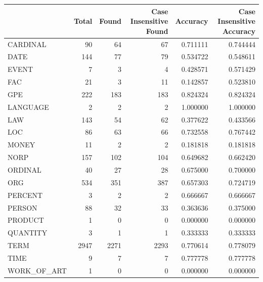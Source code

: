 \begin{tabular}{lrrrrr}
\toprule
 & Total & Found & Case Insensitive Found & Accuracy & Case Insensitive Accuracy \\
\midrule
CARDINAL & 90 & 64 & 67 & 0.711111 & 0.744444 \\
DATE & 144 & 77 & 79 & 0.534722 & 0.548611 \\
EVENT & 7 & 3 & 4 & 0.428571 & 0.571429 \\
FAC & 21 & 3 & 11 & 0.142857 & 0.523810 \\
GPE & 222 & 183 & 183 & 0.824324 & 0.824324 \\
LANGUAGE & 2 & 2 & 2 & 1.000000 & 1.000000 \\
LAW & 143 & 54 & 62 & 0.377622 & 0.433566 \\
LOC & 86 & 63 & 66 & 0.732558 & 0.767442 \\
MONEY & 11 & 2 & 2 & 0.181818 & 0.181818 \\
NORP & 157 & 102 & 104 & 0.649682 & 0.662420 \\
ORDINAL & 40 & 27 & 28 & 0.675000 & 0.700000 \\
ORG & 534 & 351 & 387 & 0.657303 & 0.724719 \\
PERCENT & 3 & 2 & 2 & 0.666667 & 0.666667 \\
PERSON & 88 & 32 & 33 & 0.363636 & 0.375000 \\
PRODUCT & 1 & 0 & 0 & 0.000000 & 0.000000 \\
QUANTITY & 3 & 1 & 1 & 0.333333 & 0.333333 \\
TERM & 2947 & 2271 & 2293 & 0.770614 & 0.778079 \\
TIME & 9 & 7 & 7 & 0.777778 & 0.777778 \\
WORK_OF_ART & 1 & 0 & 0 & 0.000000 & 0.000000 \\
\bottomrule
\end{tabular}
